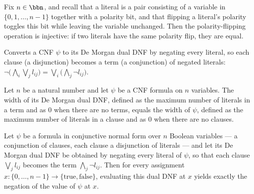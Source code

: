 \begin{lemma}
\label{Literal.flipNeg_injective}
\leanok
{}
Fix $n \in \bbn$, and recall that a literal is a pair consisting of a variable in $\{0,
1, \dots, n-1\}$ together with a polarity bit, and that flipping a literal's polarity
toggles this bit while leaving the variable unchanged. Then the polarity-flipping
operation is injective: if two literals have the same polarity flip, they are equal.
\end{lemma}

\begin{definition}
\label{CNF.dual}
\leanok
{}
Converts a CNF $\psi$ to its De Morgan dual DNF by negating every literal, so each
clause (a disjunction) becomes a term (a conjunction) of negated literals:
$\lnot\bigl(\bigwedge_i \bigvee_j l_{ij}\bigr) = \bigvee_i \bigl(\bigwedge_j \lnot l_{ij}\bigr)$.
\end{definition}

\begin{lemma}
\label{CNF.dual_width}
\leanok
{}
Let $n$ be a natural number and let $\psi$ be a CNF formula on $n$ variables. The width
of its De Morgan dual DNF, defined as the maximum number of literals in a term and as
$0$ when there are no terms, equals the width of $\psi$, defined as the maximum number
of literals in a clause and as $0$ when there are no clauses.
\end{lemma}

\begin{lemma}
\label{CNF.dual_eval}
\leanok
{}
Let $\psi$ be a formula in conjunctive normal form over $n$ Boolean variables — a
conjunction of clauses, each clause a disjunction of literals — and let its De Morgan
dual DNF be obtained by negating every literal of $\psi$, so that each clause $\bigvee_j
l_{ij}$ becomes the term $\bigwedge_j \lnot l_{ij}$. Then for every assignment $x \colon
\{0,\dots,n-1\} \to \{\mathrm{true},\mathrm{false}\}$, evaluating this dual DNF at $x$
yields exactly the negation of the value of $\psi$ at $x$.
\end{lemma}


